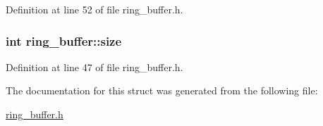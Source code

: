 Definition at line 52 of file ring\+\_\+buffer.\+h.

\hypertarget{structring__buffer_a0d2f79fe70794fc16c8536b06bff7894}{}
\subsubsection[{size}]{\setlength{\rightskip}{0pt plus 5cm}int ring\+\_\+buffer\+::size}\label{structring__buffer_a0d2f79fe70794fc16c8536b06bff7894}


Definition at line 47 of file ring\+\_\+buffer.\+h.



The documentation for this struct was generated from the following file\+:\begin{DoxyCompactItemize}
\item 
\hyperlink{ring__buffer_8h}{ring\+\_\+buffer.\+h}\end{DoxyCompactItemize}
